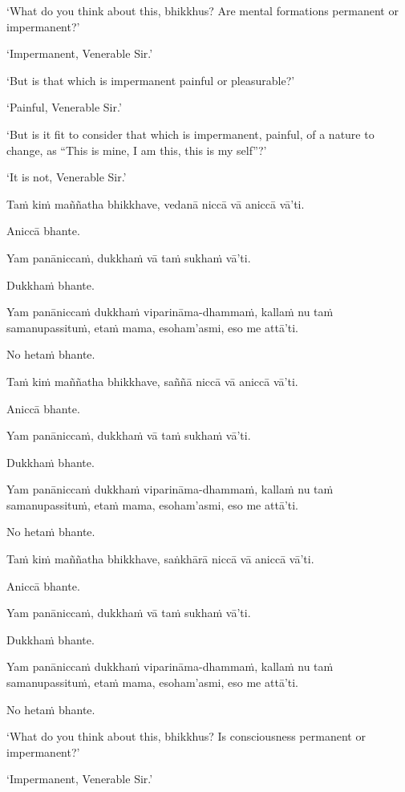 ‘What do you think about this, bhikkhus? Are mental formations
permanent or impermanent?’

‘Impermanent, Venerable Sir.’

‘But is that which is impermanent painful or pleasurable?’

‘Painful, Venerable Sir.’

‘But is it fit to consider that which is impermanent, painful, of a
nature to change, as “This is mine, I am this, this is my self”?’

‘It is not, Venerable Sir.’

\clearpage

\paliText
\markboth{\paliTitle}{\rightmark}

Taṁ kiṁ maññatha bhikkhave, vedanā niccā vā aniccā vā'ti.

Aniccā bhante.

Yam panāniccaṁ, dukkhaṁ vā taṁ sukhaṁ vā'ti.

Dukkhaṁ bhante.

Yam panāniccaṁ dukkhaṁ viparināma-dhammaṁ, kallaṁ nu taṁ samanupassituṁ,
etaṁ mama, esoham'asmi, eso me attā'ti.

No hetaṁ bhante.

Taṁ kiṁ maññatha bhikkhave, saññā niccā vā aniccā vā'ti.

Aniccā bhante.

Yam panāniccaṁ, dukkhaṁ vā taṁ sukhaṁ vā'ti.

Dukkhaṁ bhante.

Yam panāniccaṁ dukkhaṁ viparināma-dhammaṁ, kallaṁ nu taṁ samanupassituṁ,
etaṁ mama, esoham'asmi, eso me attā'ti.

No hetaṁ bhante.

Taṁ kiṁ maññatha bhikkhave, saṅkhārā niccā vā aniccā vā'ti.

Aniccā bhante.

Yam panāniccaṁ, dukkhaṁ vā taṁ sukhaṁ vā'ti.

Dukkhaṁ bhante.

Yam panāniccaṁ dukkhaṁ viparināma-dhammaṁ, kallaṁ nu taṁ samanupassituṁ,
etaṁ mama, esoham'asmi, eso me attā'ti.

No hetaṁ bhante.

\clearpage

\englishText
\markboth{\englishTitle}{\rightmark}

‘What do you think about this, bhikkhus? Is consciousness permanent or
impermanent?’

‘Impermanent, Venerable Sir.’

